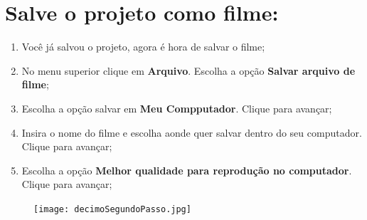 \documentclass{article}
\begin{document}
{\newpage

\section{Salve o projeto como filme:}
\begin{enumerate}
\item Você já salvou o projeto, agora é hora de salvar o filme;
\item No menu superior clique em \textbf{Arquivo}. Escolha a opção \textbf{Salvar arquivo de filme};
\item Escolha a opção salvar em \textbf{Meu Compputador}. Clique para
avançar;
\item Insira o nome do filme e escolha aonde quer salvar dentro do seu computador. Clique para avançar;
\item Escolha a opção \textbf{Melhor qualidade para reprodução no computador}. Clique para avançar;
\end{enumerate}

\begin{figure}[h!]%
    \centering
    \qquad
\end{figure}

\begin{figure}[h!]
\centering
\texttt{[image: decimoSegundoPasso.jpg]}
\end{figure}

}
\end{document}
